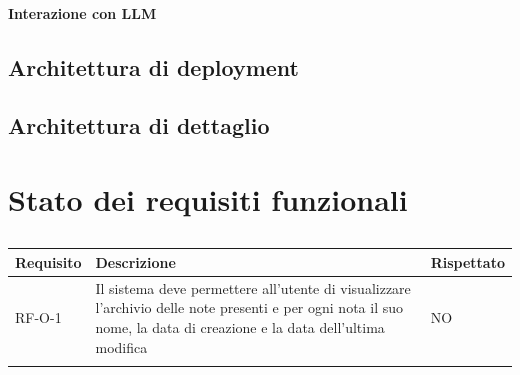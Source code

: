 \documentclass[a4paper,10pt]{article}
\begin{document}
\paragraph{Interazione con LLM}

\subsection{Architettura di deployment}

\subsection{Architettura di dettaglio}

\newpage

\section{Stato dei requisiti funzionali}
\begin{center}
    \begin{longtable}{|>{\centering\arraybackslash}m{2.5cm}|>{\centering\arraybackslash}m{8cm}|>{\centering\arraybackslash}m{2.5cm}|}
        \hline
        \textbf{Requisito} & \textbf{Descrizione} & \textbf{Rispettato} \\ \hline
        \endfirsthead
        \hline
        RF-O-1 & Il sistema deve permettere all’utente di visualizzare l’archivio delle note presenti e per ogni nota il suo nome, la data di creazione e la data dell’ultima modifica & NO \\ \hline
        \caption{}
    \end{longtable}
\end{center}
\end{document}
